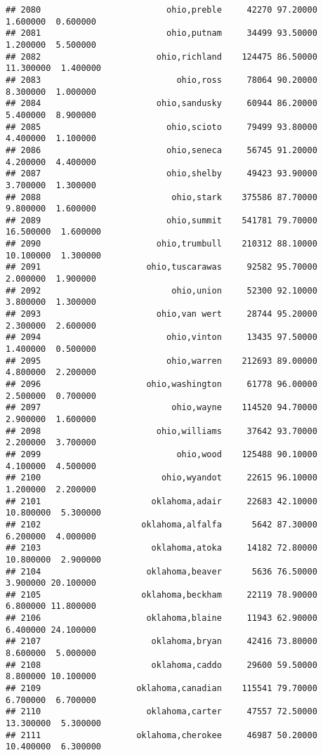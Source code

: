 \documentclass[
]{article}
\begin{document}
\begin{verbatim}
## 2080                         ohio,preble     42270 97.20000  1.600000  0.600000
## 2081                         ohio,putnam     34499 93.50000  1.200000  5.500000
## 2082                       ohio,richland    124475 86.50000 11.300000  1.400000
## 2083                           ohio,ross     78064 90.20000  8.300000  1.000000
## 2084                       ohio,sandusky     60944 86.20000  5.400000  8.900000
## 2085                         ohio,scioto     79499 93.80000  4.400000  1.100000
## 2086                         ohio,seneca     56745 91.20000  4.200000  4.400000
## 2087                         ohio,shelby     49423 93.90000  3.700000  1.300000
## 2088                          ohio,stark    375586 87.70000  9.800000  1.600000
## 2089                         ohio,summit    541781 79.70000 16.500000  1.600000
## 2090                       ohio,trumbull    210312 88.10000 10.100000  1.300000
## 2091                     ohio,tuscarawas     92582 95.70000  2.000000  1.900000
## 2092                          ohio,union     52300 92.10000  3.800000  1.300000
## 2093                       ohio,van wert     28744 95.20000  2.300000  2.600000
## 2094                         ohio,vinton     13435 97.50000  1.400000  0.500000
## 2095                         ohio,warren    212693 89.00000  4.800000  2.200000
## 2096                     ohio,washington     61778 96.00000  2.500000  0.700000
## 2097                          ohio,wayne    114520 94.70000  2.900000  1.600000
## 2098                       ohio,williams     37642 93.70000  2.200000  3.700000
## 2099                           ohio,wood    125488 90.10000  4.100000  4.500000
## 2100                        ohio,wyandot     22615 96.10000  1.200000  2.200000
## 2101                      oklahoma,adair     22683 42.10000 10.800000  5.300000
## 2102                    oklahoma,alfalfa      5642 87.30000  6.200000  4.000000
## 2103                      oklahoma,atoka     14182 72.80000 10.800000  2.900000
## 2104                     oklahoma,beaver      5636 76.50000  3.900000 20.100000
## 2105                    oklahoma,beckham     22119 78.90000  6.800000 11.800000
## 2106                     oklahoma,blaine     11943 62.90000  6.400000 24.100000
## 2107                      oklahoma,bryan     42416 73.80000  8.600000  5.000000
## 2108                      oklahoma,caddo     29600 59.50000  8.800000 10.100000
## 2109                   oklahoma,canadian    115541 79.70000  6.700000  6.700000
## 2110                     oklahoma,carter     47557 72.50000 13.300000  5.300000
## 2111                   oklahoma,cherokee     46987 50.20000 10.400000  6.300000

\end{verbatim}
\end{document}
